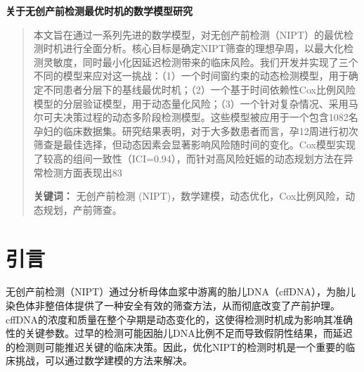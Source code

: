 \documentclass[UTF8, a4paper, 11pt]{ctexart}
\begin{document}
\thispagestyle{plain} %
\setcounter{page}{1}

\begin{center}
    {\Large \bfseries 关于无创产前检测最优时机的数学模型研究}
    \vspace{2em}
\end{center}

\begin{abstract}
\noindent %
本文旨在通过一系列先进的数学模型，对无创产前检测（NIPT）的最优检测时机进行全面分析。核心目标是确定NIPT筛查的理想孕周，以最大化检测灵敏度，同时最小化因延迟检测带来的临床风险。我们开发并实现了三个不同的模型来应对这一挑战：（1）一个时间窗约束的动态检测模型，用于确定不同患者分层下的基线最优时机；（2）一个基于时间依赖性Cox比例风险模型的分层验证模型，用于动态量化风险；（3）一个针对复杂情况、采用马尔可夫决策过程的动态多阶段检测模型。这些模型被应用于一个包含1082名孕妇的临床数据集。研究结果表明，对于大多数患者而言，孕12周进行初次筛查是最佳选择，但动态因素会显著影响风险随时间的变化。Cox模型实现了较高的组间一致性（ICI=0.94），而针对高风险妊娠的动态规划方法在异常检测方面表现出83%
\vspace{1em}

\noindent\textbf{关键词：} 无创产前检测 (NIPT)，数学建模，动态优化，Cox比例风险，动态规划，产前筛查。
\end{abstract}

\newpage


\section{引言}
无创产前检测（NIPT）通过分析母体血浆中游离的胎儿DNA（cffDNA），为胎儿染色体非整倍体提供了一种安全有效的筛查方法，从而彻底改变了产前护理。cffDNA的浓度和质量在整个孕期是动态变化的，这使得检测时机成为影响其准确性的关键参数。过早的检测可能因胎儿DNA比例不足而导致假阴性结果，而延迟的检测则可能推迟关键的临床决策。因此，优化NIPT的检测时机是一个重要的临床挑战，可以通过数学建模的方法来解决。
\end{document}
